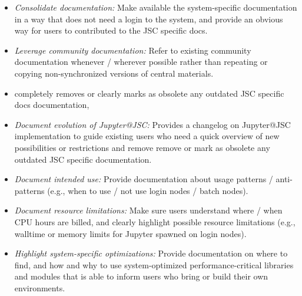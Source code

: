 \begin{itemize}
  \item \emph{Consolidate documentation:} Make available the system-specific documentation in a way that does not need a login to the system, and provide an obvious way for users to contributed to the JSC specific docs.
  \item \emph{Leverage community documentation:} Refer to existing community documentation whenever / wherever possible rather than repeating or copying non-synchronized versions of central materials.
  \item completely removes or clearly marks as obsolete any outdated JSC specific docs documentation,
  \item \emph{Document evolution of Jupyter@JSC:} Provides a changelog on Jupyter@JSC implementation to guide existing users who need a quick overview of new possibilities or restrictions and remove remove or mark as obsolete any outdated JSC specific documentation.
  \item \emph{Document intended use:} Provide documentation about usage patterns / anti-patterns (e.g., when to use / not use login nodes / batch nodes).
  \item \emph{Document resource limitations:} Make sure users understand where / when CPU hours are billed, and clearly highlight possible resource limitations (e.g., walltime or memory limits for Jupyter spawned on login nodes).
  \item \emph{Highlight system-specific optimizations:} Provide documentation on where to find, and how and why to use system-optimized performance-critical libraries and modules that is able to inform users who bring or build their own environments.
\end{itemize}
